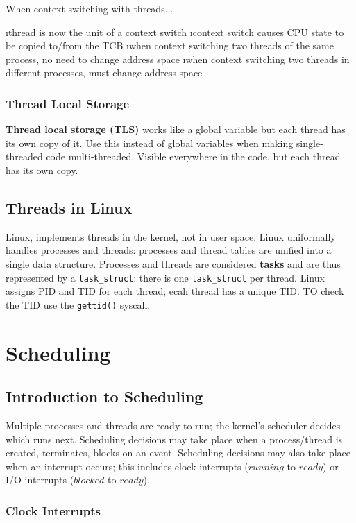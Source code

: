 \documentclass{article}
\begin{document}
    When context switching with threads...

    \bl
    \i thread is now the unit of a context switch
    \i context switch causes CPU state to be copied to/from the TCB
    \i when context switching two threads of the same process, no need to change address space
    \i when context switching two threads in different processes, must change address space 
    \el

    \subsubsection{Thread Local Storage}

    \textbf{Thread local storage (TLS)} works like a global variable but each thread has its own copy of it. Use this instead of global variables when making single-threaded code multi-threaded. Visible everywhere in the code, but each thread has its own copy. 

\subsection{Threads in Linux}

    Linux, implements threads in the kernel, not in user space. Linux uniformally handles processes and threads: processes and thread tables are unified into a single data structure. Processes and threads are considered \textbf{tasks} and are thus represented by a \texttt{task\_struct}: there is one \texttt{task\_struct} per thread. Linux assigns PID and TID for each thread; ecah thread has a unique TID. TO check the TID use the \texttt{gettid()} syscall. 

\section{Scheduling}

\subsection{Introduction to Scheduling}

    Multiple processes and threads are ready to run; the kernel's scheduler decides which runs next. Scheduling decisions may take place when a process/thread is created, terminates, blocks on an event. Scheduling decisions may also take place when an interrupt occurs; this includes clock interrupts ($running$ to $ready$) or I/O interrupts ($blocked$ to $ready$). 

    \subsubsection{Clock Interrupts}
\end{document}

